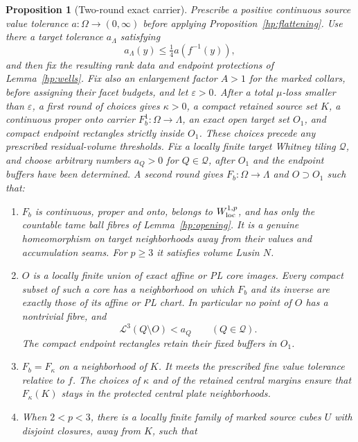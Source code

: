\documentclass[11pt]{article}
\numberwithin{equation}{section}
\newtheorem{proposition}[theorem]{Proposition}
\theoremstyle{definition}
\theoremstyle{remark}
\newcommand{\eps}{\varepsilon}
\newcommand{\cL}{\mathcal L}
\begin{document}
\begin{proposition}[Two-round exact carrier]\label{hp:carrier}
Prescribe a positive continuous source value tolerance
$a:\Omega\to(0,\infty)$ before applying Proposition~\ref{hp:flattening}.
Use there a target tolerance $a_\Lambda$ satisfying
\[
 a_\Lambda(y)\leq\tfrac14 a(f^{-1}(y)),
\]
and then fix the resulting rank data and endpoint protections of
Lemma~\ref{hp:wells}.  Fix also an enlargement factor $A>1$ for the
marked collars, before assigning their facet budgets, and let $\eps>0$.
After a total $\mu$-loss smaller than $\eps$, a first round of choices
gives $\kappa>0$, a compact retained source set $K$, a continuous
proper onto carrier $F_b^1:\Omega\to\Lambda$, an exact open target
set $O_1$, and compact endpoint rectangles strictly inside $O_1$.
These choices precede any prescribed residual-volume thresholds.
Fix a locally finite target Whitney tiling $\mathcal Q$, and choose
arbitrary numbers $a_Q>0$ for $Q\in\mathcal Q$, after $O_1$ and the
endpoint buffers have been determined.  A second round gives
$F_b:\Omega\to\Lambda$ and $O\supset O_1$ such that:
\begin{enumerate}[label=\textup{(\roman*)}]
\item $F_b$ is continuous, proper and onto, belongs to
$W^{1,p}_{\rm loc}$, and has only the countable tame ball fibres of
Lemma~\ref{hp:opening}.  It is a genuine homeomorphism on target
neighborhoods away from their values and accumulation seams.
For $p\geq3$ it satisfies volume Lusin $N$.
\item $O$ is a locally finite union of exact affine or PL core
images.  Every compact subset of such a core has a neighborhood on
which $F_b$ and its inverse are exactly those of its affine or PL
chart.  In particular no point of $O$ has a nontrivial fibre, and
\begin{equation}\label{hp:residual-volume}
 \cL^3(Q\setminus O)<a_Q\qquad(Q\in\mathcal Q).
\end{equation}
The compact endpoint rectangles retain their fixed buffers in $O_1$.
\item $F_b=F_\kappa$ on a neighborhood of $K$.  It meets the
prescribed fine value tolerance relative to $f$.  The choices of
$\kappa$ and of the retained central margins ensure that
$F_\kappa(K)$ stays in the protected central plate neighborhoods.
\item When $2<p<3$, there is a locally finite family of marked
source cubes $U$ with disjoint closures, away from $K$, such that
\begin{equation}\label{hp:small-marked-mass}

\end{equation}
\end{enumerate}
\end{proposition}
\end{document}
